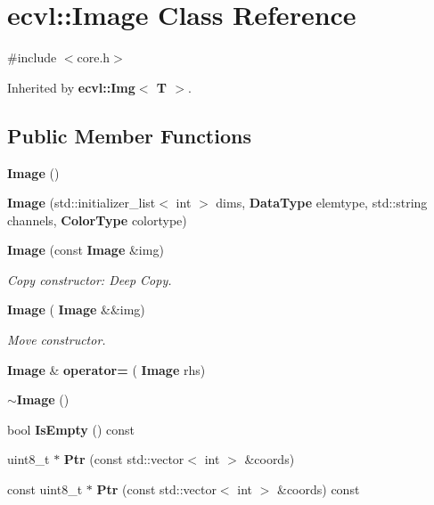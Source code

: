 \section{ecvl\+::Image Class Reference}
\label{classecvl_1_1_image}


{\ttfamily \#include $<$core.\+h$>$}



Inherited by \textbf{ ecvl\+::\+Img$<$ T $>$}.

\subsection*{Public Member Functions}
\begin{DoxyCompactItemize}
\item 
\textbf{ Image} ()
\item 
\textbf{ Image} (std\+::initializer\+\_\+list$<$ int $>$ dims, \textbf{ Data\+Type} elemtype, std\+::string channels, \textbf{ Color\+Type} colortype)
\item 
\textbf{ Image} (const \textbf{ Image} \&img)
\begin{DoxyCompactList}\small\item\em Copy constructor\+: Deep Copy. \end{DoxyCompactList}\item 
\textbf{ Image} (\textbf{ Image} \&\&img)
\begin{DoxyCompactList}\small\item\em Move constructor. \end{DoxyCompactList}\item 
\textbf{ Image} \& \textbf{ operator=} (\textbf{ Image} rhs)
\item 
\textbf{ $\sim$\+Image} ()
\item 
bool \textbf{ Is\+Empty} () const
\item 
uint8\+\_\+t $\ast$ \textbf{ Ptr} (const std\+::vector$<$ int $>$ \&coords)
\item 
const uint8\+\_\+t $\ast$ \textbf{ Ptr} (const std\+::vector$<$ int $>$ \&coords) const
\end{DoxyCompactItemize}
